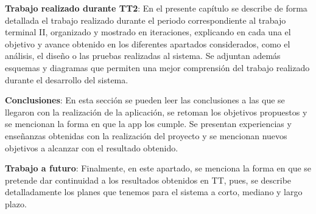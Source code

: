 \newpage 
\noindent
\textbf{Trabajo realizado durante TT2}: En el presente capítulo se describe de forma detallada el trabajo realizado durante el periodo correspondiente al trabajo terminal II, organizado y mostrado en iteraciones, explicando en cada una el objetivo y avance obtenido en los diferentes apartados considerados, como el análisis, el diseño o las pruebas realizadas al sistema. Se adjuntan además esquemas y diagramas que permiten una mejor comprensión del trabajo realizado durante el desarrollo del sistema.
\newline

\noindent
\textbf{Conclusiones}: En esta sección se pueden leer las conclusiones a las que se llegaron con la realización de la aplicación, se retoman los objetivos propuestos y se mencionan la forma en que la app los cumple. Se presentan experiencias y enseñanzas obtenidas con la realización del proyecto y se mencionan nuevos objetivos a alcanzar con el resultado obtenido. 
\newline

\noindent
\textbf{Trabajo a futuro}: Finalmente, en este apartado, se menciona la forma en que se pretende dar continuidad a los resultados obtenidos en TT, pues, se describe detalladamente los planes que tenemos para el sistema a corto, mediano y largo plazo.
\newline
